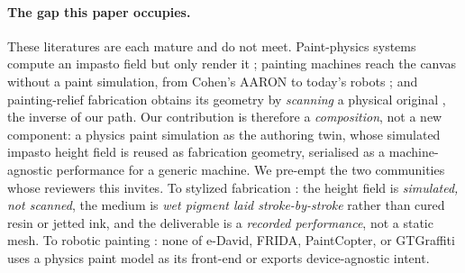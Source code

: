 \documentclass[11pt]{article}
\begin{document}
\paragraph{The gap this paper occupies.} These literatures are each mature and do
not meet. Paint-physics systems compute an impasto field but only render it
\citep{baxter2004impasto,chen2015wetbrush}; painting machines reach the canvas
without a paint simulation, from Cohen's AARON to today's robots
\citep{mccorduck1991aaron,lindemeier2015edavid,schaldenbrand2023frida}; and
painting-relief fabrication obtains its geometry by \emph{scanning} a physical
original \citep{elkhuizen2019reproducing,zaman2014capture}, the inverse of our
path. Our contribution is therefore a \emph{composition}, not a new component: a
physics paint simulation as the authoring twin, whose simulated impasto height
field is reused as fabrication geometry, serialised as a machine-agnostic
performance for a generic machine. We pre-empt the two communities whose reviewers
this invites. To stylized fabrication \citep{bickel2018fabrication,weyrich2007basrelief}:
the height field is \emph{simulated, not scanned}, the medium is \emph{wet pigment
laid stroke-by-stroke} rather than cured resin or jetted ink, and the deliverable
is a \emph{recorded performance}, not a static mesh. To robotic painting
\citep{gulzow2020survey}: none of e-David, FRIDA, PaintCopter, or GTGraffiti uses
a physics paint model as its front-end or exports device-agnostic intent.
\end{document}
